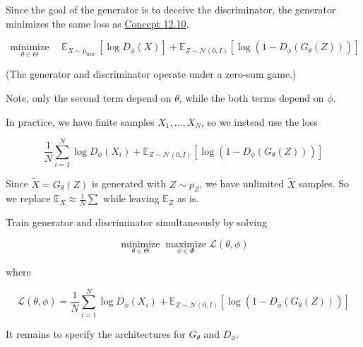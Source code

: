 \documentclass{report}
\begin{document}
\begin{concept}
    Since the goal of the generator is to deceive the discriminator, the generator minimizes the same loss as \hyperref[concept:12.10]{Concept 12.10}.

    $$
    \underset{\theta \in \Theta}{\operatorname{minimize}} \quad \mathbb{E}_{X \sim p_{\text {true }}}\left[\log D_{\phi}(X)\right]+\mathbb{E}_{Z \sim \mathcal{N}(0, I)}\left[\log \left(1-D_{\phi}\left(G_{\theta}(Z)\right)\right)\right]
    $$

    (The generator and discriminator operate under a zero-sum game.)

    Note, only the second term depend on $\theta$, while the both terms depend on $\phi$.
\end{concept}

\begin{concept}
    In practice, we have finite samples $X_{1}, \ldots, X_{N}$, so we instead use the loss

    $$
    \frac{1}{N} \sum_{i=1}^{N} \log D_{\phi}\left(X_{i}\right)+\mathbb{E}_{Z \sim \mathcal{N}(0, I)}\left[\log \left(1-D_{\phi}\left(G_{\theta}(Z)\right)\right)\right]
    $$

    Since $\tilde{X}=G_{\theta}(Z)$ is generated with $Z \sim p_{Z}$, we have unlimited $\tilde{X}$ samples. So we replace $\mathbb{E}_{X} \approx \frac{1}{N} \sum$ while leaving $\mathbb{E}_{Z}$ as is.
\end{concept}

\begin{definition}
    Train generator and discriminator simultaneously by solving

    $$
    \underset{\theta \in \Theta}{\operatorname{minimize}} \underset{\phi \in \Phi}{\operatorname{maximize}} \mathcal{L}(\theta, \phi)
    $$

    where

    $$
    \mathcal{L}(\theta, \phi)=\frac{1}{N} \sum_{i=1}^{N} \log D_{\phi}\left(X_{i}\right)+\mathbb{E}_{Z \sim \mathcal{N}(0, I)}\left[\log \left(1-D_{\phi}\left(G_{\theta}(Z)\right)\right)\right]
    $$

    It remains to specify the architectures for $G_{\theta}$ and $D_{\phi}$.
\end{definition}
\end{document}
